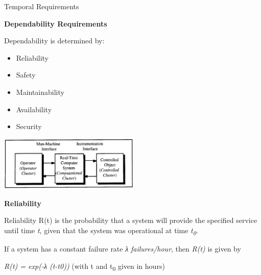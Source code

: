 \begin{frame}{Temporal Requirements}


\textbf{Dependability Requirements}

Dependability is determined by:

\begin{itemize}
\item
  Reliability
\item
  Safety
\item
  Maintainability
\item
  Availability
\item
  Security
\end{itemize}

\includegraphics[width=0.5\textwidth]{media/Fig_1_1.png}

\textbf{Reliability}

Reliability R(t) is the probability that a system will provide the
specified service until time \emph{t}, given that the system was
operational at time \emph{t\textsubscript{0}}.

If a system has a constant failure rate \emph{λ} \emph{failures/hour},
then \emph{R(t)} is given by

\emph{R(t) = exp(-λ (t-t0))} (with t and t\textsubscript{0} given in
hours)

\end{frame}

